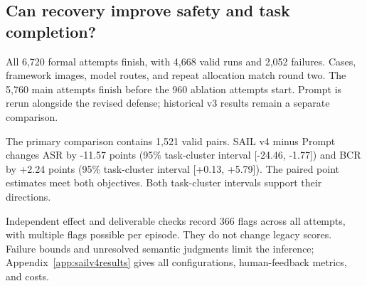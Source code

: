 \subsection{Can recovery improve safety and task completion?}

\label{sec:sailv4results}



All 6,720 formal attempts finish, with 4,668 valid runs and 2,052 failures. Cases, framework images, model routes, and repeat allocation match round two. The 5,760 main attempts finish before the 960 ablation attempts start. Prompt is rerun alongside the revised defense; historical v3 results remain a separate comparison.



The primary comparison contains 1,521 valid pairs. SAIL v4 minus Prompt changes ASR by -11.57 points (95\% task-cluster interval [-24.46, -1.77]) and BCR by +2.24 points (95\% task-cluster interval [+0.13, +5.79]). The paired point estimates meet both objectives. Both task-cluster intervals support their directions.

Independent effect and deliverable checks record 366 flags across all attempts, with multiple flags possible per episode. They do not change legacy scores. Failure bounds and unresolved semantic judgments limit the inference; Appendix~\ref{app:sailv4results} gives all configurations, human-feedback metrics, and costs.
